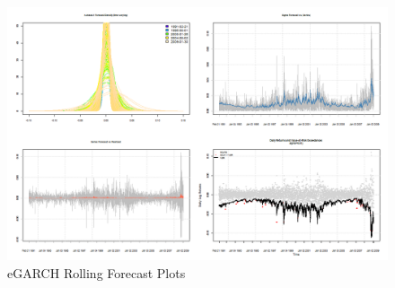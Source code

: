 \begin{figure}
\centering
\includegraphics{roll.png}
\caption[eGARCH Rolling Forecast Plots]{eGARCH Rolling Forecast Plots}\label{fig:roll}
\end{figure}
\clearpage
